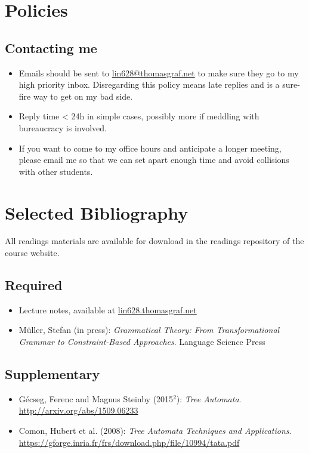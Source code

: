 \section{Policies}

\subsection{Contacting me}
\begin{itemize}
    \item Emails should be sent to \href{mailto://lin628@thomasgraf.net}{lin628@thomasgraf.net} to make sure they go to my high priority inbox.
        Disregarding this policy means late replies and is a sure-fire way to get on my bad side.
    \item Reply time < 24h in simple cases, possibly more if meddling with bureaucracy is involved.
    \item If you want to come to my office hours and anticipate a longer meeting, please email me so that we can set apart enough time and avoid collisions with other students.
\end{itemize}



\section{Selected Bibliography}

All readings materials are available for download in the readings repository of the course website.

\subsection{Required}
\begin{itemize}
    \item Lecture notes, available at \url{lin628.thomasgraf.net}
    \item Müller, Stefan (in press): \emph{Grammatical Theory: From Transformational Grammar to Constraint-Based Approaches}. Language Science Press
\end{itemize}

\subsection{Supplementary}
\begin{itemize}
    \item Gécseg, Ferenc and Magnus Steinby (2015$^2$): \emph{Tree Automata}. \url{http://arxiv.org/abs/1509.06233}
    \item Comon, Hubert et al. (2008): \emph{Tree Automata Techniques and Applications}. \url{https://gforge.inria.fr/frs/download.php/file/10994/tata.pdf}
\end{itemize}
